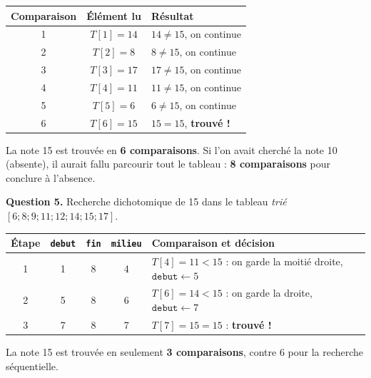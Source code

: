 \documentclass[11pt]{article}
\begin{document}
\begin{exoresolu}
\begin{center}
\begin{tabularx}{0.85\linewidth}{|c|c|X|}
\hline
\rowcolor{popblueL}
\textbf{Comparaison} & \textbf{Élément lu} & \textbf{Résultat} \\
\hline
1 & $T[1]=14$ & $14 \neq 15$, on continue \\
\hline
2 & $T[2]=8$ & $8 \neq 15$, on continue \\
\hline
3 & $T[3]=17$ & $17 \neq 15$, on continue \\
\hline
4 & $T[4]=11$ & $11 \neq 15$, on continue \\
\hline
5 & $T[5]=6$ & $6 \neq 15$, on continue \\
\hline
6 & $T[6]=15$ & $15 = 15$, \textbf{trouvé !} \\
\hline
\end{tabularx}
\end{center}

La note 15 est trouvée en \textbf{6 comparaisons}. Si l'on avait cherché la note 10 (absente), il aurait fallu parcourir tout le tableau : \textbf{8 comparaisons} pour conclure à l'absence.

\textbf{Question 5.} Recherche dichotomique de 15 dans le tableau \emph{trié} $[6 ; 8 ; 9 ; 11 ; 12 ; 14 ; 15 ; 17]$.

\begin{center}
\begin{tabularx}{\linewidth}{|c|c|c|c|X|}
\hline
\rowcolor{popblueL}
\textbf{Étape} & \texttt{debut} & \texttt{fin} & \texttt{milieu} & \textbf{Comparaison et décision} \\
\hline
1 & 1 & 8 & 4 & $T[4]=11 < 15$ : on garde la moitié droite, $\texttt{debut} \leftarrow 5$ \\
\hline
2 & 5 & 8 & 6 & $T[6]=14 < 15$ : on garde la droite, $\texttt{debut} \leftarrow 7$ \\
\hline
3 & 7 & 8 & 7 & $T[7]=15 = 15$ : \textbf{trouvé !} \\
\hline
\end{tabularx}
\end{center}

La note 15 est trouvée en seulement \textbf{3 comparaisons}, contre 6 pour la recherche séquentielle.


\end{exoresolu}
\end{document}
